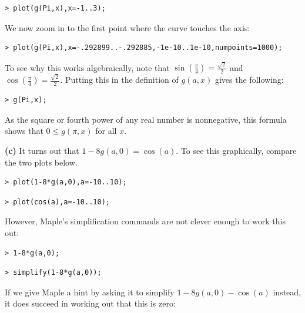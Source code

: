 \documentclass{article}
\begin{document}
\begin{lstlisting}
> plot(g(Pi,x),x=-1..3);
\end{lstlisting}
\begin{Maple Normal}
We now zoom in to the first point where the curve touches the axis:
\end{Maple Normal}
\begin{lstlisting}
> plot(g(Pi,x),x=-.292899..-.292885,-1e-10..1e-10,numpoints=1000);
\end{lstlisting}
\begin{Maple Normal}
To see why this works algebraically, note that 
$\sin (\frac{\pi}{4})=\frac{\sqrt{2}}{2}$ and 
$\cos (\frac{\pi}{4})=\frac{\sqrt{2}}{2}$.  Putting this in the definition of 
$g (a ,x)$ gives the following:
\end{Maple Normal}
\begin{lstlisting}
> g(Pi,x);
\end{lstlisting}
\begin{Maple Normal}
As the square or fourth power of any real number is nonnegative, this formula shows that 
$0\le g (\pi,x)$ for all 
$x$.
\end{Maple Normal}
\begin{Maple Normal}

\end{Maple Normal}
\begin{Maple Normal}
\textbf{(c) }It turns out that 
$1-8 g (a ,0)=\cos (a)$.  To see this graphically, compare the two plots below.
\end{Maple Normal}
\begin{lstlisting}
> plot(1-8*g(a,0),a=-10..10);
\end{lstlisting}
\begin{lstlisting}
> plot(cos(a),a=-10..10);
\end{lstlisting}
\begin{Maple Normal}
However, Maple's simplification commands are not clever enough to work this out:
\end{Maple Normal}
\begin{lstlisting}
> 1-8*g(a,0);
\end{lstlisting}
\begin{lstlisting}
> simplify(1-8*g(a,0));
\end{lstlisting}
\begin{Maple Normal}
If we give Maple a hint by asking it to simplify 
$1-8 g (a ,0)-\cos (a)$ instead, it does succeed in working out that this is zero:
\end{Maple Normal}
\end{document}

